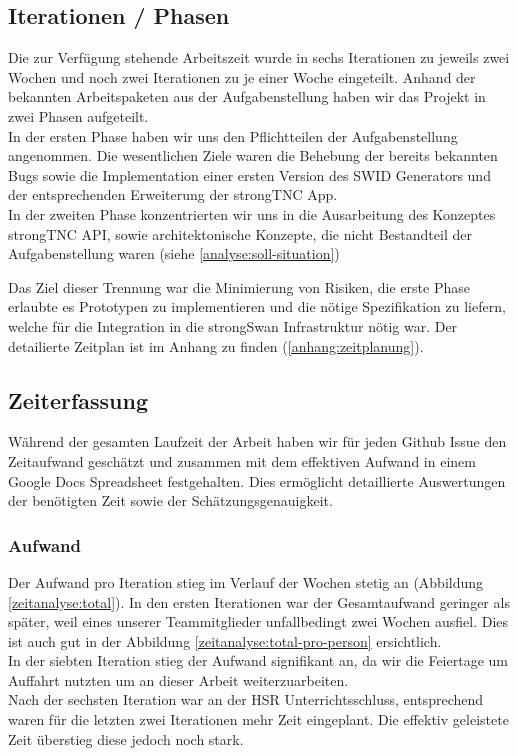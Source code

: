 \subsection{Iterationen / Phasen}

Die zur Verfügung stehende Arbeitszeit wurde in sechs Iterationen zu jeweils
zwei Wochen und noch zwei Iterationen zu je einer Woche eingeteilt. Anhand der
bekannten Arbeitspaketen aus der Aufgabenstellung haben wir das Projekt in zwei
Phasen aufgeteilt. \\
In der ersten Phase haben wir uns den Pflichtteilen der Aufgabenstellung
angenommen. Die wesentlichen Ziele waren die Behebung der bereits bekannten Bugs
sowie die Implementation einer ersten Version des SWID Generators und der
entsprechenden Erweiterung der strongTNC App. \\
In der zweiten Phase konzentrierten wir uns in die Ausarbeitung des Konzeptes
strongTNC API, sowie architektonische Konzepte, die nicht Bestandteil der
Aufgabenstellung waren (siehe \autoref{analyse:soll-situation})

Das Ziel dieser Trennung war die Minimierung von Risiken, die erste Phase
erlaubte es Prototypen zu implementieren und die nötige Spezifikation zu
liefern, welche für die Integration in die strongSwan Infrastruktur nötig war.
Der detailierte Zeitplan ist im Anhang zu finden (\autoref{anhang:zeitplanung}).

\subsection{Zeiterfassung}

Während der gesamten Laufzeit der Arbeit haben wir für jeden Github Issue den
Zeitaufwand geschätzt und zusammen mit dem effektiven Aufwand in einem Google
Docs Spreadsheet festgehalten. Dies ermöglicht detaillierte Auswertungen der
benötigten Zeit sowie der Schätzungsgenauigkeit.

\subsubsection{Aufwand}

Der Aufwand pro Iteration stieg im Verlauf der Wochen stetig an (Abbildung
\ref{zeitanalyse:total}). In den ersten Iterationen war der Gesamtaufwand
geringer als später, weil eines unserer Teammitglieder unfallbedingt zwei Wochen
ausfiel. Dies ist auch gut in der Abbildung \ref{zeitanalyse:total-pro-person}
ersichtlich. \\
In der siebten Iteration stieg der Aufwand signifikant an, da wir die Feiertage
um Auffahrt nutzten um an dieser Arbeit weiterzuarbeiten. \\
Nach der sechsten Iteration war an der HSR Unterrichtsschluss, entsprechend
waren für die letzten zwei Iterationen mehr Zeit eingeplant. Die effektiv
geleistete Zeit überstieg diese jedoch noch stark.

